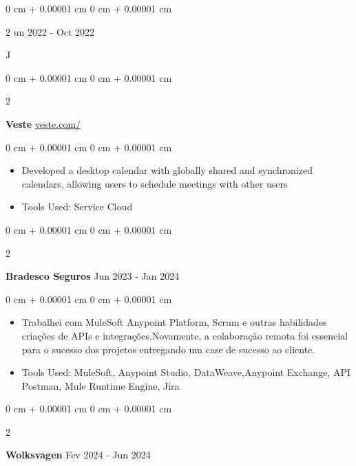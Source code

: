 \documentclass[10pt, letterpaper]{article}
\newenvironment{highlights}{
    \begin{itemize}[
        topsep=0.10 cm,
        parsep=0.10 cm,
        partopsep=0pt,
        itemsep=0pt,
        leftmargin=0 cm + 10pt
    ]
}{
    \end{itemize}
} %
\newenvironment{onecolentry}{
    \begin{adjustwidth}{
        0 cm + 0.00001 cm
    }{
        0 cm + 0.00001 cm
    }
}{
    \end{adjustwidth}
} %
\newenvironment{twocolentry}[2][]{
    \onecolentry
    \def\secondColumn{#2}
    \setcolumnwidth{\fill, 4.5 cm}
    \begin{paracol}{2}
}{
    \switchcolumn \raggedleft \secondColumn
    \end{paracol}
    \endonecolentry
} %
\begin{document}
        \vspace{0.2 cm}

        \begin{twocolentry}
            Jun 2022 - Oct 2022
        \end{twocolentry}
        

        \begin{twocolentry}{
            \href{veste.com}{veste.com/}
        }
            \textbf{Veste}\end{twocolentry}

        \vspace{0.10 cm}
        \begin{onecolentry}
            \begin{highlights}
                \item Developed a desktop calendar with globally shared and synchronized calendars, allowing users to schedule meetings with other users
                \item Tools Used: Service Cloud
            \end{highlights}
        \end{onecolentry}


        \vspace{0.2 cm}

        \begin{twocolentry}{
            Jun 2023 - Jan 2024
        }
        
            \textbf{Bradesco Seguros}\end{twocolentry}

        \vspace{0.10 cm}
        \begin{onecolentry}
            \begin{highlights}
                \item Trabalhei com MuleSoft Anypoint Platform, Scrum e outras habilidades criações de APIs e integrações.Novamente, a colaboração remota foi essencial para o sucesso dos projetos entregando um case de sucesso ao cliente.
                \item Tools Used: MuleSoft, Anypoint Studio, DataWeave,Anypoint Exchange, API  Postman, Mule Runtime Engine, Jira
            \end{highlights}
        \end{onecolentry}


        \vspace{0.2 cm}

        \begin{twocolentry}{
            Fev 2024 - Jun 2024 
        }
        
            \textbf{Wolksvagen}\end{twocolentry}
\end{document}
